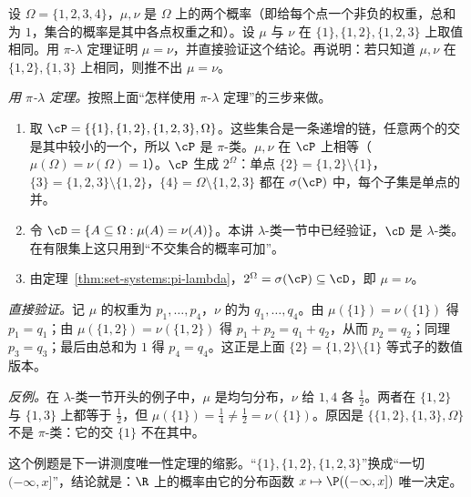 \begin{workedexample}\label{we:set-systems:pi-lambda-finite}
设 $\Omega=\{1,2,3,4\}$，$\mu,\nu$ 是 $\Omega$ 上的两个概率（即给每个点一个非负的权重，总和为 $1$，集合的概率是其中各点权重之和）。设 $\mu$ 与 $\nu$ 在 $\{1\},\{1,2\},\{1,2,3\}$ 上取值相同。用 $\pi$-$\lambda$ 定理证明 $\mu=\nu$，并直接验证这个结论。再说明：若只知道 $\mu,\nu$ 在 $\{1,2\},\{1,3\}$ 上相同，则推不出 $\mu=\nu$。
\end{workedexample}
\begin{solution}
\emph{用 $\pi$-$\lambda$ 定理。}按照上面“怎样使用 $\pi$-$\lambda$ 定理”的三步来做。
\begin{enumerate}
\item 取 $\cP=\{\{1\},\{1,2\},\{1,2,3\},\Omega\}$。这些集合是一条递增的链，任意两个的交是其中较小的一个，所以 $\cP$ 是 $\pi$-类。$\mu,\nu$ 在 $\cP$ 上相等（$\mu(\Omega)=\nu(\Omega)=1$）。$\cP$ 生成 $2^\Omega$：单点 $\{2\}=\{1,2\}\setminus\{1\}$，$\{3\}=\{1,2,3\}\setminus\{1,2\}$，$\{4\}=\Omega\setminus\{1,2,3\}$ 都在 $\sigma(\cP)$ 中，每个子集是单点的并。
\item 令 $\cD=\{A\subseteq\Omega:\mu(A)=\nu(A)\}$。本讲 $\lambda$-类一节中已经验证，$\cD$ 是 $\lambda$-类。在有限集上这只用到“不交集合的概率可加”。
\item 由定理~\ref{thm:set-systems:pi-lambda}，$2^\Omega=\sigma(\cP)\subseteq\cD$，即 $\mu=\nu$。
\end{enumerate}

\emph{直接验证。}记 $\mu$ 的权重为 $p_1,\dots,p_4$，$\nu$ 的为 $q_1,\dots,q_4$。由 $\mu(\{1\})=\nu(\{1\})$ 得 $p_1=q_1$；由 $\mu(\{1,2\})=\nu(\{1,2\})$ 得 $p_1+p_2=q_1+q_2$，从而 $p_2=q_2$；同理 $p_3=q_3$；最后由总和为 $1$ 得 $p_4=q_4$。这正是上面 $\{2\}=\{1,2\}\setminus\{1\}$ 等式子的数值版本。

\emph{反例。}在 $\lambda$-类一节开头的例子中，$\mu$ 是均匀分布，$\nu$ 给 $1,4$ 各 $\frac12$。两者在 $\{1,2\}$ 与 $\{1,3\}$ 上都等于 $\frac12$，但 $\mu(\{1\})=\frac14\neq\frac12=\nu(\{1\})$。原因是 $\{\{1,2\},\{1,3\},\Omega\}$ 不是 $\pi$-类：它的交 $\{1\}$ 不在其中。

这个例题是下一讲测度唯一性定理的缩影。“$\{1\},\{1,2\},\{1,2,3\}$”换成“一切 $(-\infty,x]$”，结论就是：$\R$ 上的概率由它的分布函数 $x\mapsto \P((-\infty,x])$ 唯一决定。
\end{solution}


